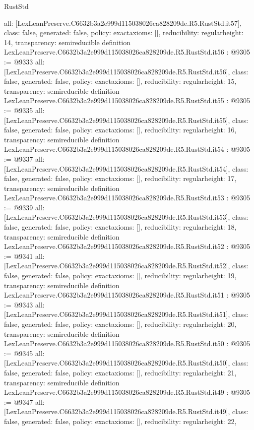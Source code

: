 \begin{lexlean}{RustStd}
\begin{coremodule}
{  all: [LexLeanPreserve.C6632b3a2e999d115038026ca828209de.R5.RustStd.it57],
  class: false,
  generated: false,
  policy: exact{axioms: []},
  reducibility: regular{height: 14},
  transparency: semireducible
}
definition LexLeanPreserve.C6632b3a2e999d115038026ca828209de.R5.RustStd.it56 : @9305 := @9333 {
  all: [LexLeanPreserve.C6632b3a2e999d115038026ca828209de.R5.RustStd.it56],
  class: false,
  generated: false,
  policy: exact{axioms: []},
  reducibility: regular{height: 15},
  transparency: semireducible
}
definition LexLeanPreserve.C6632b3a2e999d115038026ca828209de.R5.RustStd.it55 : @9305 := @9335 {
  all: [LexLeanPreserve.C6632b3a2e999d115038026ca828209de.R5.RustStd.it55],
  class: false,
  generated: false,
  policy: exact{axioms: []},
  reducibility: regular{height: 16},
  transparency: semireducible
}
definition LexLeanPreserve.C6632b3a2e999d115038026ca828209de.R5.RustStd.it54 : @9305 := @9337 {
  all: [LexLeanPreserve.C6632b3a2e999d115038026ca828209de.R5.RustStd.it54],
  class: false,
  generated: false,
  policy: exact{axioms: []},
  reducibility: regular{height: 17},
  transparency: semireducible
}
definition LexLeanPreserve.C6632b3a2e999d115038026ca828209de.R5.RustStd.it53 : @9305 := @9339 {
  all: [LexLeanPreserve.C6632b3a2e999d115038026ca828209de.R5.RustStd.it53],
  class: false,
  generated: false,
  policy: exact{axioms: []},
  reducibility: regular{height: 18},
  transparency: semireducible
}
definition LexLeanPreserve.C6632b3a2e999d115038026ca828209de.R5.RustStd.it52 : @9305 := @9341 {
  all: [LexLeanPreserve.C6632b3a2e999d115038026ca828209de.R5.RustStd.it52],
  class: false,
  generated: false,
  policy: exact{axioms: []},
  reducibility: regular{height: 19},
  transparency: semireducible
}
definition LexLeanPreserve.C6632b3a2e999d115038026ca828209de.R5.RustStd.it51 : @9305 := @9343 {
  all: [LexLeanPreserve.C6632b3a2e999d115038026ca828209de.R5.RustStd.it51],
  class: false,
  generated: false,
  policy: exact{axioms: []},
  reducibility: regular{height: 20},
  transparency: semireducible
}
definition LexLeanPreserve.C6632b3a2e999d115038026ca828209de.R5.RustStd.it50 : @9305 := @9345 {
  all: [LexLeanPreserve.C6632b3a2e999d115038026ca828209de.R5.RustStd.it50],
  class: false,
  generated: false,
  policy: exact{axioms: []},
  reducibility: regular{height: 21},
  transparency: semireducible
}
definition LexLeanPreserve.C6632b3a2e999d115038026ca828209de.R5.RustStd.it49 : @9305 := @9347 {
  all: [LexLeanPreserve.C6632b3a2e999d115038026ca828209de.R5.RustStd.it49],
  class: false,
  generated: false,
  policy: exact{axioms: []},
  reducibility: regular{height: 22},
}
\end{coremodule}
\end{lexlean}
